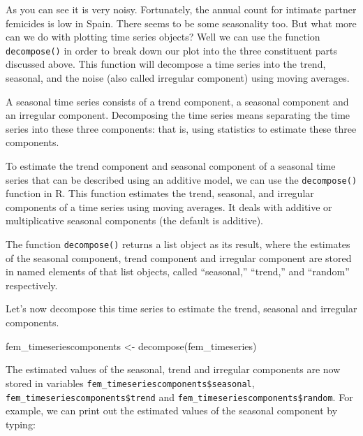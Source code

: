 \documentclass[
  krantz2]{krantz}
\makeatletter
\newenvironment{Shaded}{\begin{snugshade}}{\end{snugshade}}
\newcommand{\FunctionTok}[1]{\textcolor[rgb]{0,0,0}{#1}}
\newcommand{\NormalTok}[1]{#1}
\newcommand{\OtherTok}[1]{\textcolor[rgb]{0.37,0.37,0.37}{#1}}
\newcommand{\SpecialCharTok}[1]{\textcolor[rgb]{0,0,0}{#1}}
\newenvironment{kframe}{%
\medskip{}
\setlength{\fboxsep}{.8em}
 \def\at@end@of@kframe{}%
 \ifinner\ifhmode%
  \def\at@end@of@kframe{\end{minipage}}%
  \begin{minipage}{\columnwidth}%
 \fi\fi%
 \def\FrameCommand##1{\hskip\@totalleftmargin \hskip-\fboxsep
 \colorbox{shadecolor}{##1}\hskip-\fboxsep
     \hskip-\linewidth \hskip-\@totalleftmargin \hskip\columnwidth}%
 \MakeFramed {\advance\hsize-\width
   \@totalleftmargin\z@ \linewidth\hsize
   \@setminipage}}%
 {\par\unskip\endMakeFramed%
 \at@end@of@kframe}
\renewenvironment{Shaded}{\begin{kframe}}{\end{kframe}}
\makeatother
\begin{document}
As you can see it is very noisy. Fortunately, the annual count for intimate partner femicides is low in Spain. There seems to be some seasonality too. But what more can we do with plotting time series objects? Well we can use the function \texttt{decompose()} in order to break down our plot into the three constituent parts discussed above. This function will decompose a time series into the trend, seasonal, and the noise (also called irregular component) using moving averages.

A seasonal time series consists of a trend component, a seasonal component and an irregular component. Decomposing the time series means separating the time series into these three components: that is, using statistics to estimate these three components.

To estimate the trend component and seasonal component of a seasonal time series that can be described using an additive model, we can use the \texttt{decompose()} function in R. This function estimates the trend, seasonal, and irregular components of a time series using moving averages. It deals with additive or multiplicative seasonal components (the default is additive).

The function \texttt{decompose()} returns a list object as its result, where the estimates of the seasonal component, trend component and irregular component are stored in named elements of that list objects, called ``seasonal,'' ``trend,'' and ``random'' respectively.

Let's now decompose this time series to estimate the trend, seasonal and irregular components.

\begin{Shaded}
\begin{Highlighting}[]
\NormalTok{fem\_timeseriescomponents }\OtherTok{\textless{}{-}} \FunctionTok{decompose}\NormalTok{(fem\_timeseries)}
\end{Highlighting}
\end{Shaded}

The estimated values of the seasonal, trend and irregular components are now stored in variables \texttt{fem\_timeseriescomponents\$seasonal}, \texttt{fem\_timeseriescomponents\$trend} and \texttt{fem\_timeseriescomponents\$random}. For example, we can print out the estimated values of the seasonal component by typing:

\begin{Shaded}
\end{Shaded}
\end{document}
